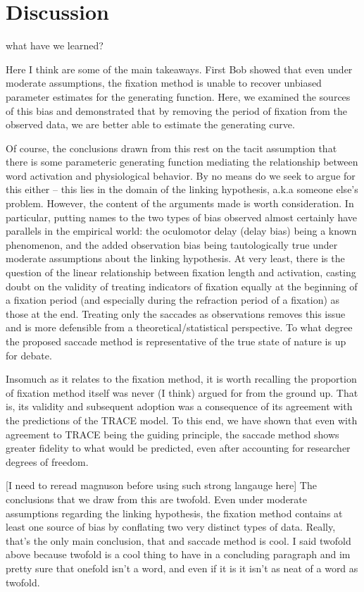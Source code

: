 \documentclass{article}
\begin{document}
\section{Discussion}

what have we learned?

Here I think are some of the main takeaways. First Bob showed that even under moderate assumptions, the fixation method is unable to recover unbiased parameter estimates for the generating function. Here, we examined the sources of this bias and demonstrated that by removing the period of fixation from the observed data, we are better able to estimate the generating curve. 

Of course, the conclusions drawn from this rest on the tacit assumption that there is some parameteric generating function mediating the relationship between word activation and physiological behavior. By no means do we seek to argue for this either -- this lies in the domain of the linking hypothesis, a.k.a someone else's problem. However, the content of the arguments made is worth consideration. In particular, putting names to the two types of bias observed almost certainly have parallels in the empirical world: the oculomotor delay (delay bias) being a known phenomenon, and the added observation bias being tautologically true under moderate assumptions about the linking hypothesis. At very least, there is the question of the linear relationship between fixation length and activation, casting doubt on the validity of treating indicators of fixation equally at the beginning of a fixation period (and especially during the refraction  period of a fixation) as those at the end. Treating only the saccades as observations removes this issue and is more defensible from a theoretical/statistical perspective. To what degree the proposed saccade method is representative of the true state of nature is up for debate.

Insomuch as it relates to the fixation method, it is worth recalling the proportion of fixation method itself was never (I think) argued for from the ground up. That is, its validity and subsequent adoption was a consequence of its agreement with the predictions of the TRACE model. To this end, we have shown that even with agreement to TRACE being the guiding principle, the saccade method shows greater fidelity to what would be predicted, even after accounting for researcher degrees of freedom.

[I need to reread magnuson before using such strong langauge here]
The conclusions that we draw from this are twofold. Even under moderate assumptions regarding the linking hypothesis, the fixation method contains at least one source of bias by conflating two very distinct types of data. Really, that's the only main conclusion, that and saccade method is cool. I said twofold above because twofold is a cool thing to have in a concluding paragraph and im pretty sure that onefold isn't a word, and even if it is it isn't as neat of a word as twofold.
\end{document}
